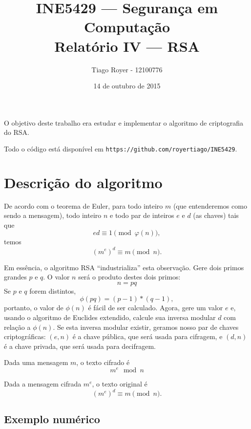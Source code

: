 \documentclass{article}
\title{
    INE5429 --- Segurança em Computação \\
    Relatório IV --- RSA
}
\author{
    Tiago Royer - 12100776
}
\date{14 de outubro de 2015}
\begin{document}
\maketitle

O objetivo deste trabalho era estudar e implementar
o algoritmo de criptografia do RSA.

Todo o código está disponível em \verb"https://github.com/royertiago/INE5429".

\section{Descrição do algoritmo}

De acordo com o teorema de Euler,
para todo inteiro $m$ (que entenderemos como sendo a mensagem),
todo inteiro $n$ e todo par de inteiros $e$ e $d$
(as chaves)
tais que
\begin{equation*}
    ed \equiv 1 \pmod{\varphi(n)},
\end{equation*}
temos
\begin{equation*}
    (m^e)^d \equiv m \pmod n.
\end{equation*}

Em essência,
o algoritmo RSA ``industrializa'' esta observação.
Gere dois primos grandes $p$ e $q$.
O valor $n$ será o produto destes dois primos:
\begin{equation*}
    n = pq
\end{equation*}
Se $p$ e $q$ forem distintos,
\begin{equation*}
    \phi(pq) = (p-1) * (q-1),
\end{equation*}
portanto, o valor de $\phi(n)$ é fácil de ser calculado.
Agora,
gere um valor $e$ e,
usando o algoritmo de Euclides extendido,
calcule sua inversa modular $d$ com relação a $\phi(n)$.
Se esta inversa modular existir,
geramos nosso par de chaves criptográficas:
$(e, n)$ é a chave pública,
que será usada para cifragem,
e $(d, n)$ é a chave privada,
que será usada para decifragem.

Dada uma mensagem $m$, o texto cifrado é
\begin{equation*}
    m^e \mod n
\end{equation*}

Dada a mensagem cifrada $m^e$, o texto original é
\begin{equation*}
    (m^e)^d \equiv m \pmod n.
\end{equation*}

\subsection{Exemplo numérico}
\end{document}
